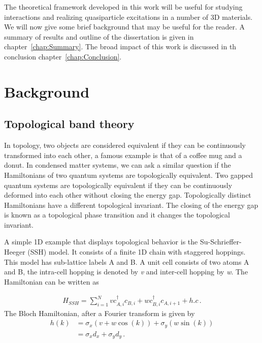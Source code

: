 The theoretical framework developed in this work will be useful for studying interactions and realizing quasiparticle excitations in a number of 3D materials. We will now give some brief background that may be useful for the reader. A summary of results and outline of the dissertation is given in chapter~\ref{chap:Summary}. The broad impact of this work is discussed in th conclusion chapter~\ref{chap:Conclusion}. 



\section{Background}

\subsection{Topological band theory}
In topology, two objects are considered equivalent if they can be continuously transformed into each other, a famous example is that of a coffee mug and a donut. In condensed matter systems, we can ask a similar question if the Hamiltonians of two quantum systems are topologically equivalent. Two gapped quantum systems are topologically equivalent if they can be continuously deformed into each other without closing the energy gap. Topologically distinct Hamiltonians have a different topological invariant. The closing of the energy gap is known as a topological phase transition and it changes the topological invariant. 

A simple 1D example that displays topological behavior is the Su-Schrieffer-Heeger (SSH) model. It consists of a finite 1D chain with staggered hoppings. This model has sub-lattice labels A and B. A unit cell consists of two atoms A and B, the intra-cell hopping is denoted by \textit{v} and inter-cell hopping by \textit{w}. The Hamiltonian can be written as 

\begin{align}
H_{SSH} = \sum^N_{i=1} v c^{\dagger}_{A,i} c_{B,i} + w  c^{\dagger}_{B,i} c_{A,i+1} + h.c \,.
\end{align}
The Bloch Hamiltonian, after a Fourier transform is given by 
\begin{align}
h(k) &= \sigma_x (v+w \cos(k)) + \sigma_y (w \sin(k)) \\
&= \sigma_x d_x + \sigma_y d_y \,.
\end{align}

